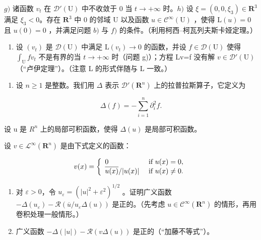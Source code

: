 \(g)\) 诸函数 \(v_{t}\) 在 \(\mathcal{D}'(\mathrm{U})\) 中不收敛于 0 当 \(t\to+\infty\) 时。\(h)\) 设 \(\xi=(0,0,\xi_{3})\in\mathbf{R}^{3}\) 满足 \(\xi_{3}<0\)。存在 \(\mathbf{R}^{3}\) 中 0 的邻域 U 以及函数 \(u\in\mathcal{C}^{\infty}(\mathrm{U})\) ，使得 \(\mathrm{L}(u)=0\) 且 \(u(0)=0\) ，并满足问题 \(b)\) 与 \(f)\) 的条件。（利用柯西–柯瓦列夫斯卡娅定理。）

\begin{enumerate}
\def\labelenumi{\roman{enumi})}
\tightlist
\item
  设 \((v_{t})\) 是 \(\mathcal{D}(\mathrm{U})\) 中满足 \(\mathrm{L}(v_{t})\to0\) 的函数，并设 \(f\in\mathcal{D}(\mathrm{U})\) 使得 \(\int_{\mathrm{U}}fv_{t}\) 不是有界的当 \(t\to+\infty\) 时（问题 g)）；方程 Lv=f 没有解 \(v\in\mathcal{D}'(\mathrm{U})\) （“卢伊定理”）。（注意 L 的形式伴随与 L 一致。）
\end{enumerate}

\begin{enumerate}
\def\labelenumi{\arabic{enumi})}
\setcounter{enumi}{31}
\tightlist
\item
  设 \(n \geqslant 1\) 是整数。我们用 \(\Delta\) 表示 \(\mathcal{D}'(\mathbf{R}^n)\) 上的拉普拉斯算子，它定义为
\end{enumerate}

\[
\Delta (f) = - \sum_ {i = 1} ^ {n} \partial_ {i} ^ {2} f.
\]

设 u 是 \(R^{n}\) 上的局部可积函数，使得 \(\Delta(u)\) 是局部可积函数。

设 \(v\in \mathcal{L}^{\infty}(\mathbf{R}^{n})\) 是由下式定义的函数：

\[
v (x) = \left\{ \begin{array}{l l} 0 & \text { if } u (x) = 0, \\ \overline {{u (x)}} / | u (x) | & \text { if } u (x) \neq 0. \end{array} \right.
\]

\begin{enumerate}
\def\labelenumi{\alph{enumi})}
\item
  对 \(\varepsilon > 0\)，令 \(u_{\varepsilon} = (|u|^2 + \varepsilon^2)^{1/2}\) 。证明广义函数 \(-\Delta(u_{\varepsilon}) - \mathcal{R}(\overline{u}/u_{\varepsilon} \Delta(u))\) 是正的。（先考虑 \(u \in \mathcal{C}^{\infty}(\mathbf{R}^{n})\) 的情形，再用卷积处理一般情形。）
\item
  广义函数 \(-\Delta(|u|) - \mathcal{R}(v\Delta(u))\) 是正的（“加藤不等式”）。
\end{enumerate}

